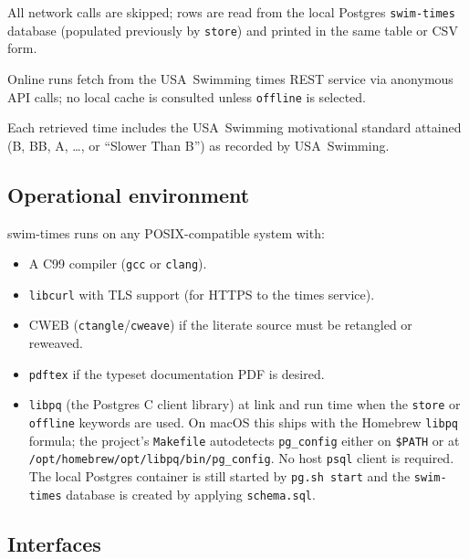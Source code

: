 \documentclass[12pt]{article}
\newcommand{\code}[1]{\texttt{#1}}
\begin{document}
\begin{description}[style=nextline]
  \item[Offline retrieval (\code{offline} keyword).]
        All network calls are skipped; rows are read from the local
        Postgres \texttt{swim-times} database (populated previously
        by \code{store}) and printed in the same table or CSV form.

  \item[Live authoritative data.]
        Online runs fetch from the USA~Swimming times REST service
        via anonymous API calls; no local cache is
        consulted unless \code{offline} is selected.

  \item[Motivational standard annotation.]
        Each retrieved time includes the USA~Swimming motivational
        standard attained (B, BB, A, \ldots, or ``Slower Than B'')
        as recorded by USA~Swimming.
\end{description}

\subsection{Operational environment}

swim-times runs on any POSIX-compatible system with:

\begin{itemize}
  \item A C99 compiler (\code{gcc} or \code{clang}).
  \item \code{libcurl} with TLS support (for HTTPS to the times service).
  \item CWEB (\code{ctangle}/\code{cweave}) if the literate source
        must be retangled or reweaved.
  \item \code{pdftex} if the typeset documentation PDF is desired.
  \item \texttt{libpq} (the Postgres C client library) at link and
        run time when the \code{store} or \code{offline} keywords
        are used.  On macOS this ships with the Homebrew
        \texttt{libpq} formula; the project's \texttt{Makefile}
        autodetects \texttt{pg\_config} either on \texttt{\$PATH}
        or at \texttt{/opt/homebrew/opt/libpq/bin/pg\_config}.  No
        host \texttt{psql} client is required.  The local Postgres
        container is still started by \texttt{pg.sh start} and the
        \texttt{swim-times} database is created by applying
        \texttt{schema.sql}.
\end{itemize}

\subsection{Interfaces}
\end{document}
